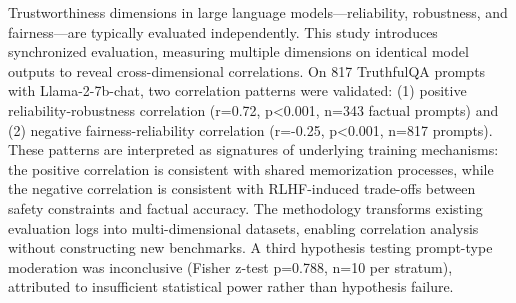 
Trustworthiness dimensions in large language models---reliability, robustness, and fairness---are typically evaluated independently. This study introduces synchronized evaluation, measuring multiple dimensions on identical model outputs to reveal cross-dimensional correlations. On 817 TruthfulQA prompts with Llama-2-7b-chat, two correlation patterns were validated: (1) positive reliability-robustness correlation (r=0.72, p<0.001, n=343 factual prompts) and (2) negative fairness-reliability correlation (r=-0.25, p<0.001, n=817 prompts). These patterns are interpreted as signatures of underlying training mechanisms: the positive correlation is consistent with shared memorization processes, while the negative correlation is consistent with RLHF-induced trade-offs between safety constraints and factual accuracy. The methodology transforms existing evaluation logs into multi-dimensional datasets, enabling correlation analysis without constructing new benchmarks. A third hypothesis testing prompt-type moderation was inconclusive (Fisher z-test p=0.788, n=10 per stratum), attributed to insufficient statistical power rather than hypothesis failure.
